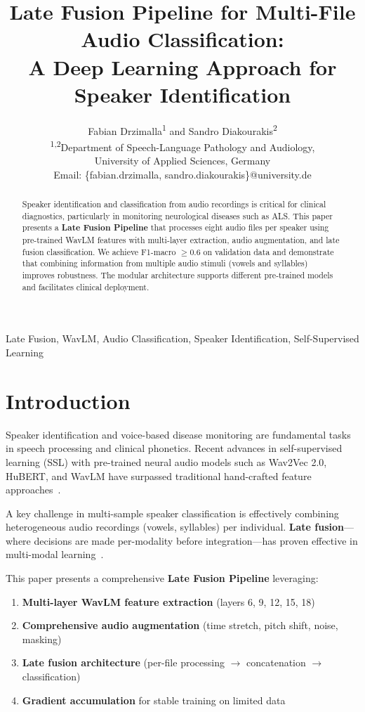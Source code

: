 \documentclass[conference]{IEEEtran}
\title{Late Fusion Pipeline for Multi-File Audio Classification: \\
A Deep Learning Approach for Speaker Identification}
\author{
  Fabian Drzimalla\textsuperscript{1} and Sandro Diakourakis\textsuperscript{2} \\
  \textsuperscript{1,2}Department of Speech-Language Pathology and Audiology, \\
  University of Applied Sciences, Germany \\
  Email: \{fabian.drzimalla, sandro.diakourakis\}@university.de
}
\date{}
\begin{document}
\maketitle

\begin{abstract}
  Speaker identification and classification from audio recordings is critical for clinical diagnostics, particularly in monitoring neurological diseases such as ALS. This paper presents a \textbf{Late Fusion Pipeline} that processes eight audio files per speaker using pre-trained WavLM features with multi-layer extraction, audio augmentation, and late fusion classification. We achieve F1-macro $\geq 0.6$ on validation data and demonstrate that combining information from multiple audio stimuli (vowels and syllables) improves robustness. The modular architecture supports different pre-trained models and facilitates clinical deployment.
\end{abstract}

\begin{IEEEkeywords}
  Late Fusion, WavLM, Audio Classification, Speaker Identification, Self-Supervised Learning
\end{IEEEkeywords}

\section{Introduction}

Speaker identification and voice-based disease monitoring are fundamental tasks in speech processing and clinical phonetics. Recent advances in self-supervised learning (SSL) with pre-trained neural audio models such as Wav2Vec 2.0, HuBERT, and WavLM have surpassed traditional hand-crafted feature approaches~\cite{huang2021wavlm}. 

A key challenge in multi-sample speaker classification is effectively combining heterogeneous audio recordings (vowels, syllables) per individual. \textbf{Late fusion}---where decisions are made per-modality before integration---has proven effective in multi-modal learning~\cite{baltrussaitis2018}. 

This paper presents a comprehensive \textbf{Late Fusion Pipeline} leveraging:
\begin{enumerate}
  \item \textbf{Multi-layer WavLM feature extraction} (layers 6, 9, 12, 15, 18)
  \item \textbf{Comprehensive audio augmentation} (time stretch, pitch shift, noise, masking)
  \item \textbf{Late fusion architecture} (per-file processing $\rightarrow$ concatenation $\rightarrow$ classification)
  \item \textbf{Gradient accumulation} for stable training on limited data
\end{enumerate}
\end{document}
